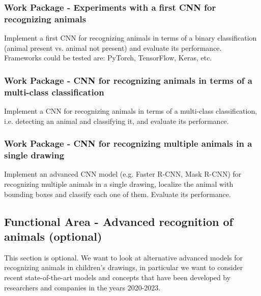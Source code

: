\subsubsection{Work Package - Experiments with a first CNN for recognizing animals}
Implement a first CNN for recognizing animals in terms of a binary classification (animal present vs. animal not present) and evaluate its performance.
Frameworks could be tested are: PyTorch, TensorFlow, Keras, etc.

\subsubsection{Work Package - CNN for recognizing animals in terms of a multi-class classification}
Implement a CNN for recognizing animals in terms of a multi-class classification, i.e. detecting an animal and classifying it, and evaluate its performance.

\subsubsection{Work Package - CNN for recognizing multiple animals in a single drawing}
Implement an advanced CNN model (e.g. Faster R-CNN, Mask R-CNN) for recognizing multiple animals in a single drawing, localize the animal with bounding boxes and classify each one of them.
Evaluate its performance.



\subsection{Functional Area - Advanced recognition of animals (optional)}
This section is optional.
We want to look at alternative advanced models for recognizing animals in children's drawings, in particular we want to consider recent state-of-the-art models and concepts that have been developed by researchers and companies in the years 2020-2023.

